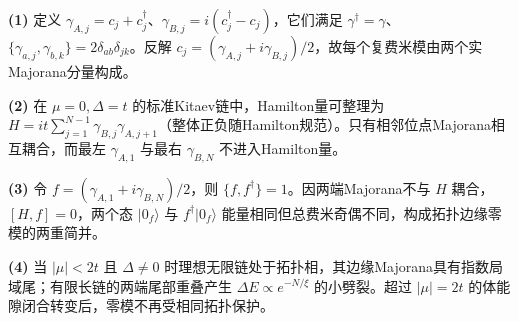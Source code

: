 \par\noindent\textbf{(1)} 定义 \(\gamma_{A,j}=c_j+c_j^\dagger\)、\(\gamma_{B,j}=i(c_j^\dagger-c_j)\)，它们满足 \(\gamma^\dagger=\gamma\)、\(\{\gamma_{a,j},\gamma_{b,k}\}=2\delta_{ab}\delta_{jk}\)。反解 \(c_j=(\gamma_{A,j}+i\gamma_{B,j})/2\)，故每个复费米模由两个实Majorana分量构成。
\par\noindent\textbf{(2)} 在 \(\mu=0,\Delta=t\) 的标准Kitaev链中，Hamilton量可整理为 \(H=it\sum_{j=1}^{N-1}\gamma_{B,j}\gamma_{A,j+1}\)（整体正负随Hamilton规范）。只有相邻位点Majorana相互耦合，而最左 \(\gamma_{A,1}\) 与最右 \(\gamma_{B,N}\) 不进入Hamilton量。
\par\noindent\textbf{(3)} 令 \(f=(\gamma_{A,1}+i\gamma_{B,N})/2\)，则 \(\{f,f^\dagger\}=1\)。因两端Majorana不与 \(H\) 耦合，\([H,f]=0\)，两个态 \(|0_f\rangle\) 与 \(f^\dagger|0_f\rangle\) 能量相同但总费米奇偶不同，构成拓扑边缘零模的两重简并。
\par\noindent\textbf{(4)} 当 \(|\mu|<2t\) 且 \(\Delta\ne0\) 时理想无限链处于拓扑相，其边缘Majorana具有指数局域尾；有限长链的两端尾部重叠产生 \(\Delta E\propto e^{-N/\xi}\) 的小劈裂。超过 \(|\mu|=2t\) 的体能隙闭合转变后，零模不再受相同拓扑保护。
